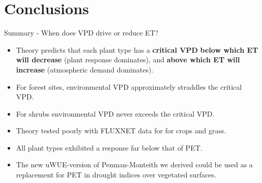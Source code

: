 \documentclass[aspectratio=169]{beamer}
\begin{document}
\section{Conclusions}


\begin{frame}{Summary - When does VPD drive or reduce ET?}
  \begin{itemize}
  \item Theory predicts that each plant type has a \textbf{critical VPD} \textbf{below which ET will decrease} (plant response dominates), and \textbf{above which ET will increase} (atmospheric demand dominates).
  \item For forest sites, environmental VPD approximately straddles the critical VPD.
  \item For shrubs environmental VPD never exceeds the critical VPD.
  \item Theory tested poorly with FLUXNET data for for crops and grass. 
  \item All plant types exhibited a response far below that of PET.
  \item The new uWUE-version of Penman-Monteith we derived could be used as a replacement for PET in drought indices over vegetated surfaces.
  \end{itemize}
\end{frame}
\end{document}
